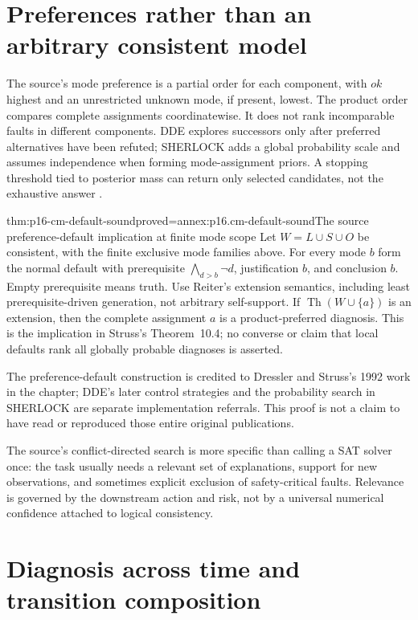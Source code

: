 \section{Preferences rather than an arbitrary consistent model}
\label{sec:p16-cm-preferences}

The source's mode preference is a partial order for each component, with
\(ok\) highest and an unrestricted unknown mode, if present, lowest.
The product order compares complete assignments coordinatewise. It does
not rank incomparable faults in different components. DDE explores successors
only after preferred alternatives have been refuted; SHERLOCK adds a global
probability scale and assumes independence when forming mode-assignment
priors. A stopping threshold tied to posterior mass can return only selected
candidates, not the exhaustive answer \cite[pp.~415--420]{Struss2008ModelBasedProblemSolving}.

\begin{hbtheorem}{thm:p16-cm-default-sound}{proved=annex:p16.cm-default-sound}{The source preference-default implication at finite mode scope}
Let \(W=L\cup S\cup O\) be consistent, with the finite exclusive
mode families above. For every mode \(b\) form the normal default with
prerequisite \(\bigwedge_{d>b}\neg d\), justification \(b\), and
conclusion \(b\). Empty prerequisite means truth. Use Reiter's extension
semantics, including least prerequisite-driven generation, not arbitrary
self-support. If \(\operatorname{Th}(W\cup\{a\})\) is an extension,
then the complete assignment \(a\) is a product-preferred diagnosis.
This is the implication in Struss's Theorem~10.4; no converse or claim that
local defaults rank all globally probable diagnoses is asserted.
\end{hbtheorem}

The preference-default construction is credited to Dressler and Struss's
1992 work in the chapter; DDE's later control strategies and the probability
search in SHERLOCK are separate implementation referrals. This proof is
not a claim to have read or reproduced those entire original publications.

The source's conflict-directed search is more specific than calling a SAT
solver once: the task usually needs a relevant set of explanations, support
for new observations, and sometimes explicit exclusion of safety-critical
faults. Relevance is governed by the downstream action and risk, not by a
universal numerical confidence attached to logical consistency.

\section{Diagnosis across time and transition composition}
\label{sec:p16-cm-temporal}

